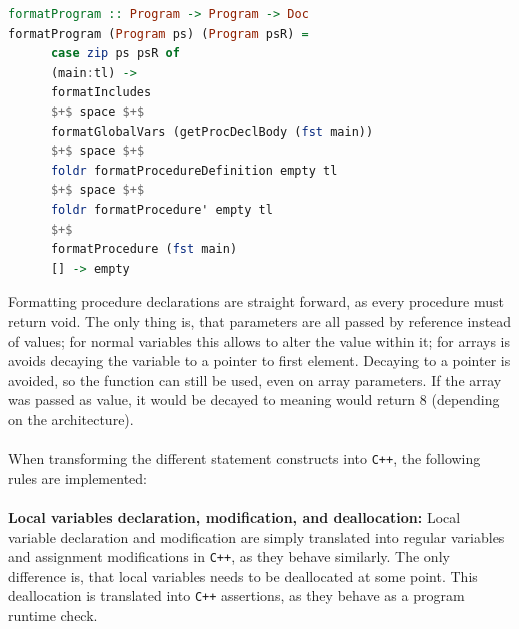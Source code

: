 \begin{lstlisting}[language=Haskell, label={lst:formatMain}, caption={Formatting AST into \texttt{C++}}]
formatProgram :: Program -> Program -> Doc
formatProgram (Program ps) (Program psR) =
      case zip ps psR of
      (main:tl) ->
      formatIncludes
      $+$ space $+$
      formatGlobalVars (getProcDeclBody (fst main))
      $+$ space $+$
      foldr formatProcedureDefinition empty tl
      $+$ space $+$
      foldr formatProcedure' empty tl
      $+$
      formatProcedure (fst main)
      [] -> empty
\end{lstlisting}
\noindent
Formatting procedure declarations are straight forward, as every procedure must return void.
The only thing is, that parameters are all passed by reference instead of values; for
normal variables this allows to alter the value within it; for arrays is avoids decaying the
variable to a pointer to first element. Decaying to a pointer is avoided, so the function
 can still be used, even on array parameters. If the array was passed as value,
it would be decayed to  meaning  would return $8$ (depending on the
architecture).
\\
\\
When transforming the different statement constructs into \texttt{C++}, the following rules
are implemented:
\\
\\
\textbf{Local variables declaration, modification, and deallocation:}
Local variable declaration and modification are simply translated into regular variables and
assignment modifications in \texttt{C++}, as they behave
similarly. The only difference is, that \lan local variables needs to be deallocated at some
point. This deallocation is translated into \texttt{C++} assertions, as they behave as a
program runtime check.

